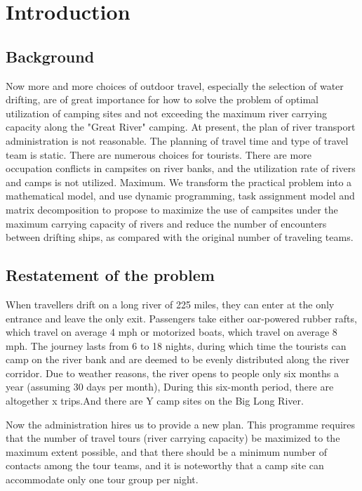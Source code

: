 \section{Introduction}
\subsection{Background}
\noindent
Now more and more choices of outdoor travel, especially the selection of water drifting, are of great importance for how to solve the problem of optimal utilization of camping sites and not exceeding the maximum river carrying capacity along the "Great River" camping. At present, the plan of river transport administration is not reasonable. The planning of travel time and type of travel team is static. There are numerous choices for tourists. There are more occupation conflicts in campsites on river banks, and the utilization rate of rivers and camps is not utilized. Maximum. We transform the practical problem into a mathematical model, and use dynamic programming, task assignment model and matrix decomposition to propose to maximize the use of campsites under the maximum carrying capacity of rivers and reduce the number of encounters between drifting ships, as compared with the original number of traveling teams.
\subsection{Restatement of the problem}
\noindent
When travellers drift on a long river of 225 miles, they can enter at the only entrance and leave the only exit. Passengers take either oar-powered rubber rafts, which travel on average 4 mph or motorized boats, which travel on average 8 mph. The journey lasts from 6 to 18 nights, during which time the tourists can camp on the river bank and are deemed to be evenly distributed along the river corridor. Due to weather reasons, the river opens to people only six months a year (assuming 30 days per month), During this six-month period, there are altogether x trips.And there are Y camp sites on the Big Long River.
\par Now the administration hires us to provide a new plan. This programme requires that the number of travel tours (river carrying capacity) be maximized to the maximum extent possible, and that there should be a minimum number of contacts among the tour teams, and it is noteworthy that a camp site can accommodate only one tour group per night.
